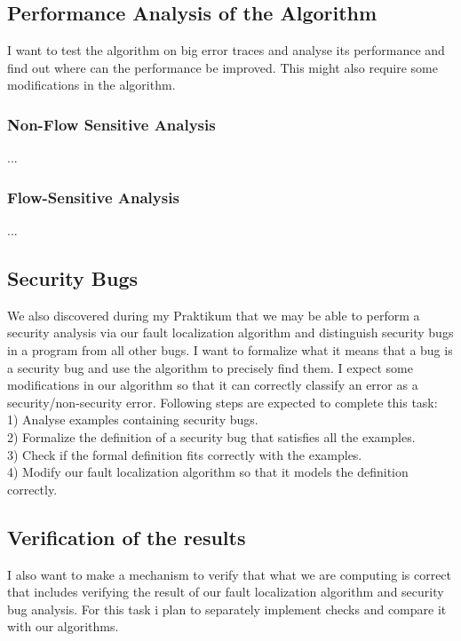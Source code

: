 \documentclass{article}
\begin{document}
\subsection{Performance Analysis of the Algorithm}
I want to test the algorithm on big error traces and analyse its performance and find out where can the performance be improved. This might also require some modifications in the algorithm.
\subsubsection{Non-Flow Sensitive Analysis}
...
\subsubsection{Flow-Sensitive Analysis}
...
\subsection{Security Bugs}
We also discovered during my Praktikum that we may be able to perform a security analysis via our fault localization algorithm and distinguish security bugs in a program from all other bugs. I want to formalize what it means that a bug is a security bug and use the algorithm to precisely find them. I expect some modifications in our algorithm so that it can correctly classify an error as a security/non-security error. Following steps are expected to complete this task: \\
1) Analyse examples containing security bugs. \\
2) Formalize the definition of a security bug that satisfies all the examples. \\
3) Check if the formal definition fits correctly with the examples. \\
4) Modify our fault localization algorithm so that it models the definition correctly.
\subsection{Verification of the results}
I also want to make a mechanism to verify that what we are computing is correct that includes verifying the result of our fault localization algorithm and security bug analysis. For this task i plan to separately implement checks and compare it with our algorithms.
\end{document}
